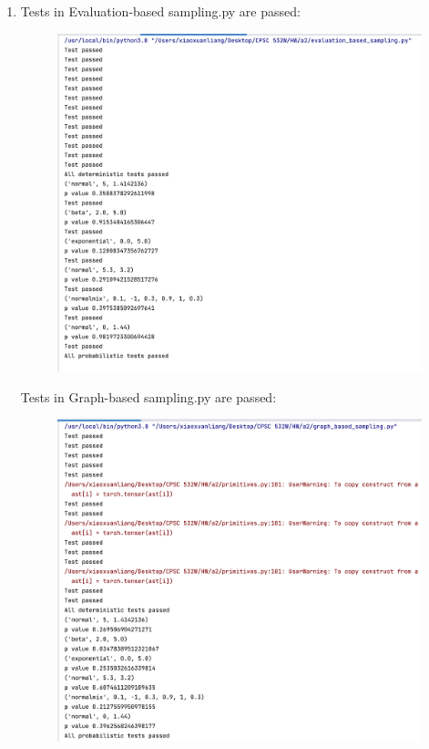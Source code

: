 \documentclass{article}
\begin{document}
\begin{enumerate}
\newpage
\item Tests in Evaluation-based sampling.py are passed:

\begin{figure}[!htp]
	\centering
	\includegraphics[scale=0.6]{../figs/evaluation_tests}
\end{figure}

\newpage
Tests in Graph-based sampling.py are passed:
\begin{figure}[!htp]
	\centering
	\includegraphics[scale=0.6]{../figs/graph_tests}
\end{figure}


\end{enumerate}
\end{document}
